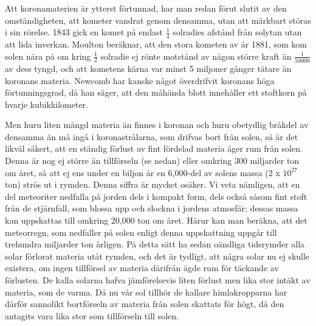 \documentclass[a4paper, 12pt, oneside, swedish]{article}
\begin{document}
Att koronamaterien är ytterst förtunnad, har man redan förut slutit av den omständigheten, att kometer vandrat genom densamma, utan att märkbart störas i sin rörelse. 1843 gick en komet på endast $\frac{1}{4}$ solradies afstånd från solytan utan att lida inverkan. Moulton beräknar, att den stora kometen av år 1881, som kom solen nära på om kring $\frac{1}{2}$ solradie ej rönte motstånd av någon större kraft än $\frac{1}{50000}$ av dess tyngd, och att kometens kärna var minst 5 miljoner gånger tätare än koronans materia. Newcomb har kanske något överdrifvit koronans höga förtunningsgrad, då han säger, att den måhända blott innehåller ett stoftkorn på hvarje kubikkilometer.

Men huru liten mängd materia än finnes i koronan och huru obetydlig bråkdel av densamma än må ingå i koronastrålarna, som drifvas bort från solen, så är det likväl säkert, att en ständig förlust av fint fördelad materia äger rum från solen. Denna är nog ej större än tillförseln (se nedan) eller omkring 300 miljarder ton om året, så att ej ens under en biljon år en 6,000-del av solens massa (2 x $10^{27}$ ton) strös ut i rymden. Denna siffra är mycket osäker. Vi veta nämligen, att en del meteoriter nedfalla på jorden dels i kompakt form, dels också såsom fint stoft från de stjärnfall, som blossa upp och slockna i jordens atmosfär; dessas massa kan uppskattas till omkring 20,000 ton om året. Härur kan man beräkna, att det meteorregn, som nedfaller på solen enligt denna uppskattning uppgår till trehundra miljarder ton årligen. På detta sätt ha sedan oändliga tidsrymder alla solar förlorat materia utåt rymden, och det är tydligt, att några solar nu ej skulle existera, om ingen tillförsel av materia därifrån ägde rum för täckande av förlusten. De kalla solarna hafva jämförelsevis liten förlust men lika stor intäkt av materia, som de varma. Då nu vår sol tillhör de kallare himlakropparna har därför sannolikt bortförseln av materia från solen skattats för högt, då den antagits vara lika stor som tillförseln till solen.
\end{document}

